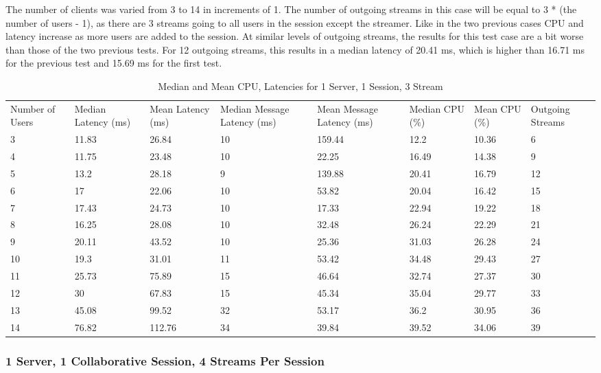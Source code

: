 The number of clients was varied from 3 to 14 in increments of 1. The number of outgoing streams in this case will be equal to 3 * (the number of users - 1), as there are 3 streams going to all users in the session except the streamer. Like in the two previous cases CPU and latency increase as more users are added to the session. At similar levels of outgoing streams, the results for this test case are a bit worse than those of the two previous tests. For 12 outgoing streams, this results in a median latency of 20.41 ms, which is higher than 16.71 ms for the previous test and 15.69 ms for the first test.


\begin{table}
\caption{Median and Mean CPU, Latencies for 1 Server, 1 Session, 3 Stream}
\label{table:1serv_1sess_3str}
\begin{tabu} to\linewidth{|X[c]|X[c]|X[c]|X[c]|X[c]|X[c]|X[c]|X[c]|}
\everyrow{\hline}
\hline
Number of Users & Median Latency (ms) & Mean Latency (ms) & Median Message Latency (ms) & Mean Message Latency (ms) & Median CPU (\%) & Mean CPU (\%) & Outgoing Streams\\
3 & 11.83 & 26.84 & 10 & 159.44 & 12.2 & 10.36 & 6 \\
4 & 11.75 & 23.48 & 10 & 22.25 & 16.49 & 14.38 & 9 \\
5 & 13.2 & 28.18 & 9 & 139.88 & 20.41 & 16.79 & 12 \\
6 & 17 & 22.06 & 10 & 53.82 & 20.04 & 16.42 & 15 \\
7 & 17.43 & 24.73 & 10 & 17.33 & 22.94 & 19.22 & 18 \\
8 & 16.25 & 28.08 & 10 & 32.48 & 26.24 & 22.29 & 21 \\
9 & 20.11 & 43.52 & 10 & 25.36 & 31.03 & 26.28 & 24 \\
10 & 19.3 & 31.01 & 11 & 53.42 & 34.48 & 29.43 & 27 \\
11 & 25.73 & 75.89 & 15 & 46.64 & 32.74 & 27.37 & 30 \\
12 & 30 & 67.83 & 15 & 45.34 & 35.04 & 29.77 & 33 \\
13 & 45.08 & 99.52 & 32 & 53.17 & 36.2 & 30.95 & 36 \\
14 & 76.82 & 112.76 & 34 & 39.84 & 39.52 & 34.06 & 39 \\
\end{tabu}
\end{table}

\clearpage\subsubsection{1 Server, 1 Collaborative Session, 4 Streams Per Session}
\label{sec:1serv_1sess_4str180}

